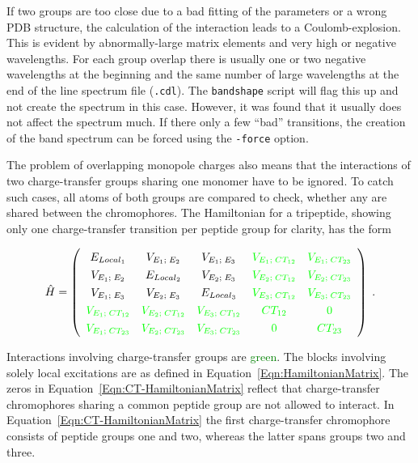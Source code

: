\documentclass[11pt, letterpaper]{article}
\newcommand{\colgreen}[1] {\textcolor{green}{#1}}
\begin{document}
If two groups are too close due to a bad fitting of the parameters or a wrong PDB structure, the calculation of the interaction leads to a Coulomb-explosion. This is evident by abnormally-large matrix elements and very high or negative wavelengths. For each group overlap there is usually one or two negative wavelengths at the beginning and the same number of large wavelengths at the end of the line spectrum file (\verb'.cdl'). The \verb'bandshape' script will flag this up and not create the spectrum in this case. However, it was found that it usually does not affect the spectrum much. If there only a few ``bad'' transitions, the creation of the band spectrum can be forced using the \verb'-force' option.

The problem of overlapping monopole charges also means that the interactions of two charge-transfer groups sharing one monomer have to be ignored. To catch such cases, all atoms of both groups are compared to check, whether any are shared between the chromophores. The Hamiltonian for a tripeptide, showing only one charge-transfer transition per peptide group for clarity, has the form\cite{Bulheller}

\begin{equation}
\linespread{1.3}\normalsize
	\hat{H} =
	\left(
		\begin{array}{ccccc}
			E_{Local_1}    & V_{E_1;\; E_2} & V_{E_1;\; E_3} & \colgreen{V_{E_1;\; CT_{12}}} & \colgreen{V_{E_1;\; CT_{23}}} \\
			V_{E_1;\; E_2} & E_{Local_2}    & V_{E_2;\; E_3} & \colgreen{V_{E_2;\; CT_{12}}} & \colgreen{V_{E_2;\; CT_{23}}} \\
			V_{E_1;\; E_3} & V_{E_2;\; E_3} & E_{Local_3}    & \colgreen{V_{E_3;\; CT_{12}}} & \colgreen{V_{E_3;\; CT_{23}}} \\
			\colgreen{V_{E_1;\; CT_{12}}} &  \colgreen{V_{E_2;\; CT_{12}}} & \colgreen{V_{E_3;\; CT_{12}}} & \colgreen{CT_{12}} & \colgreen{0}       \\
			\colgreen{V_{E_1;\; CT_{23}}} &  \colgreen{V_{E_2;\; CT_{23}}} & \colgreen{V_{E_3;\; CT_{23}}} & \colgreen{0}       & \colgreen{CT_{23}} \\
		\end{array}
	\right) \;.
	\label{Eqn:CT-HamiltonianMatrix}
\end{equation}

Interactions involving charge-transfer groups are \colgreen{green}. The blocks involving solely local excitations are as defined in Equation~\ref{Eqn:HamiltonianMatrix}. The zeros in Equation~\ref{Eqn:CT-HamiltonianMatrix} reflect that charge-transfer chromophores sharing a common peptide group are not allowed to interact. In Equation~\ref{Eqn:CT-HamiltonianMatrix} the first charge-transfer chromophore consists of peptide groups one and two, whereas the latter spans groups two and three.
\end{document}
